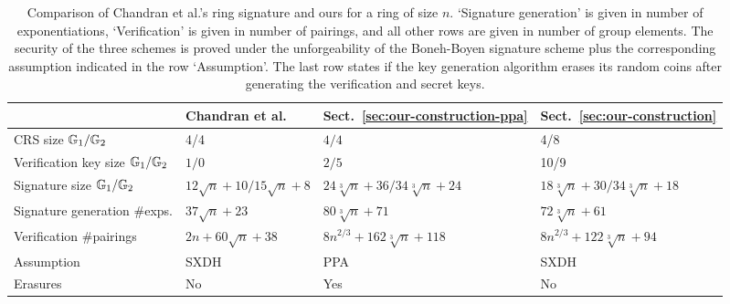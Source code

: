 
\begin{table}[h]
\begin{center}
\begin{minipage}{\textwidth}
\begin{center}
\begin{scriptsize}
\begin{tabular}{l|l|l|l}
                                           & Chandran et al.~\cite{ICALP:ChaGroSah07} & Sect.~\ref{sec:our-construction-ppa} &  Sect.~\ref{sec:our-construction} \\
\hline%
\rule{0pt}{2.5ex}CRS size  $\mathbb{G}_1/\mathbb{G}_2$              & 4/4                                      & $4/4$  & 4/8    \\
\rule{0pt}{2.5ex}Verification key size $\mathbb{G}_1/\mathbb{G}_2$    & $1/0$                                       & $2/5$  &   10/9  \\
\rule{0pt}{2.5ex}Signature size      $\mathbb{G}_1/\mathbb{G}_2$      & $12\sqrt{n}+10/15\sqrt{n}+8$                        & $24\sqrt[3]{n} + 36/34\sqrt[3]{n} + 24$& $18\sqrt[3]{n} + 30/34\sqrt[3]{n} + 18$\\
\rule{0pt}{2.5ex}Signature generation \#exps. & $37\sqrt{n}+23$                        & $80\sqrt[3]{n}+71$&$72\sqrt[3]{n}+61$\\
\rule{0pt}{2.5ex}Verification \#pairings         & $2n + 60\sqrt{n}+38$                & $8n^{2/3} + 162\sqrt[3]{n} + 118$&$8n^{2/3} + 122\sqrt[3]{n} + 94$\\
\rule{0pt}{2.5ex}Assumption         & SXDH                & PPA & SXDH\\
\rule{0pt}{2.5ex}Erasures         & No                & Yes & No\\
\end{tabular}
\end{scriptsize}
\end{center}
\caption{Comparison of Chandran et al.'s ring signature and ours for a ring of size $n$. `Signature generation' is given in number of exponentiations, `Verification' is given in number of pairings, and all other rows are given in number of group elements. The security of the three schemes is proved under the unforgeability of the Boneh-Boyen signature scheme plus the corresponding assumption indicated in the row `Assumption'.
The last row states if the key generation algorithm erases its random coins after generating the verification and secret keys.
\label{table:eff}}
\end{minipage}
\end{center}
\end{table}
